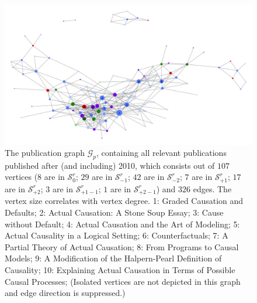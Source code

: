 \documentclass[11pt,a4paper]{book}
\theoremstyle{definition}
\theoremstyle{definition}
\theoremstyle{definition}
\theoremstyle{remark}
\newcommand{\xsetz}{\mathcal{S}_{\mathit{0}}}
\newcommand{\xsetb}{\mathcal{S}_{\mathit{-1}}}
\newcommand{\xsetbb}{\mathcal{S}_{\mathit{-2}}}
\newcommand{\xsetf}{\mathcal{S}_{\mathit{+1}}}
\newcommand{\xsetff}{\mathcal{S}_{\mathit{+2}}}
\newcommand{\xsetfb}{\mathcal{S}_{\mathit{+1-1}}}
\newcommand{\xsetffb}{\mathcal{S}_{\mathit{+2-1}}}
\newcommand{\pgraph}{\mathcal{G}_{p}}
\newcommand{\agraph}{\mathcal{G}_{a}}
\begin{document}
\begin{figure}
\includegraphics[width=\textwidth]{actual_graph.png}
\caption{The publication graph $\pgraph$, containing all relevant publications published after (and including) 2010, which consists out of $107$ vertices ($8$ are in \textcolor{cstepz}{$\xsetz^r$}; $29$ are in \textcolor{cstepb}{$\xsetb^r$};
$42$ are in \textcolor{cstepbb}{$\xsetbb^r$}; $7$ are in \textcolor{cstepf}{$\xsetf^r$}; $17$ are in \textcolor{cstepff}{$\xsetff^r$}; $3$ are in \textcolor{cstepfb}{$\xsetfb^r$}; $1$ are in \textcolor{cstepffb}{$\xsetffb^r$}) and $326$ edges. The vertex size correlates with vertex degree.
1: Graded Causation and Defaults;
2: Actual Causation: A Stone Soup Essay;
3: Cause without Default;
4: Actual Causation and the Art of Modeling;
5: Actual Causality in a Logical Setting;
6: Counterfactuals;
7: A Partial Theory of Actual Causation;
8: From Programs to Causal Models;
9: A Modification of the Halpern-Pearl Definition of Causality;
10: Explaining Actual Causation in Terms of Possible Causal Processes;
(Isolated vertices are not depicted in this graph and edge direction is suppressed.)}
\label{fig:pgraph-actual_graph}
\end{figure}




\end{document}
